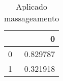\begin{table}
\centering
\caption{Aplicado massageamento}
\label{Aplicado massageamento 10}
\begin{tabular}{lr}
\toprule
{} &         0 \\
\midrule
0 &  0.829787 \\
1 &  0.321918 \\
\bottomrule
\end{tabular}
\end{table}
